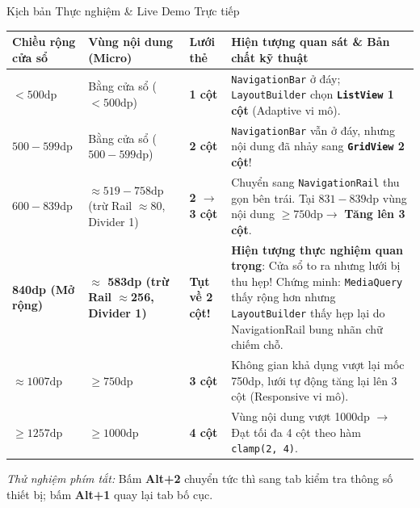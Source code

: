 \documentclass[aspectratio=169, 10pt]{beamer}
\begin{document}
\begin{frame}{Kịch bản Thực nghiệm \& Live Demo Trực tiếp}
  \vspace{-0.2cm}
  \centering
  \footnotesize
  \setlength{\tabcolsep}{4pt}
  \renewcommand{\arraystretch}{1.18}
  \begin{tabular}{|>{\centering\arraybackslash}p{2.3cm}|>{\centering\arraybackslash}p{2.4cm}|>{\centering\arraybackslash}p{1.4cm}|>{\raggedright\arraybackslash}p{6.4cm}|}
    \hline
    \rowcolor{TableHead}
    \centering\color{white}\textbf{Chiều rộng cửa sổ} & 
    \centering\color{white}\textbf{Vùng nội dung (Micro)} & 
    \centering\color{white}\textbf{Lưới thẻ} & 
    \centering\color{white}\textbf{Hiện tượng quan sát \& Bản chất kỹ thuật} \tabularnewline
    \hline
    \rowcolor{TableRowOdd}
    $< 500\text{dp}$ & 
    Bằng cửa sổ ($< 500\text{dp}$) & 
    \textbf{1 cột} & 
    \texttt{NavigationBar} ở đáy; \texttt{LayoutBuilder} chọn \textbf{\texttt{ListView} 1 cột} (Adaptive vi mô). \tabularnewline
    \hline
    \rowcolor{TableRowEven}
    $500 - 599\text{dp}$ & 
    Bằng cửa sổ ($500 - 599\text{dp}$) & 
    \textbf{2 cột} & 
    \texttt{NavigationBar} vẫn ở đáy, nhưng nội dung đã nhảy sang \textbf{\texttt{GridView} 2 cột}! \tabularnewline
    \hline
    \rowcolor{TableRowOdd}
    $600 - 839\text{dp}$ & 
    $\approx 519 - 758\text{dp}$ (trừ Rail $\approx 80$, Divider 1) & 
    \textbf{2 $\rightarrow$ 3 cột} & 
    Chuyển sang \texttt{NavigationRail} thu gọn bên trái. Tại $831 - 839\text{dp}$ vùng nội dung $\ge 750\text{dp} \rightarrow$ \textbf{Tăng lên 3 cột}. \tabularnewline
    \hline
    \rowcolor{TableRowEven}
    \textbf{840dp (Mở rộng)} & 
    \textbf{$\approx$ 583dp (trừ Rail $\approx$256, Divider 1)} & 
    \textbf{Tụt về 2 cột!} & 
    \textbf{Hiện tượng thực nghiệm quan trọng}: Cửa sổ to ra nhưng lưới bị thu hẹp! Chứng minh: \texttt{MediaQuery} thấy rộng hơn nhưng \texttt{LayoutBuilder} thấy hẹp lại do NavigationRail bung nhãn chữ chiếm chỗ. \tabularnewline
    \hline
    \rowcolor{TableRowOdd}
    $\approx 1007\text{dp}$ & 
    $\ge 750\text{dp}$ & 
    \textbf{3 cột} & 
    Không gian khả dụng vượt lại mốc 750dp, lưới tự động tăng lại lên 3 cột (Responsive vi mô). \tabularnewline
    \hline
    \rowcolor{TableRowEven}
    $\ge 1257\text{dp}$ & 
    $\ge 1000\text{dp}$ & 
    \textbf{4 cột} & 
    Vùng nội dung vượt 1000dp $\rightarrow$ Đạt tối đa 4 cột theo hàm \texttt{clamp(2, 4)}. \tabularnewline
    \hline
  \end{tabular}

  \vspace{0.14cm}
  \centering
  \scriptsize
  \textit{Thử nghiệm phím tắt:} Bấm \textbf{Alt+2} chuyển tức thì sang tab kiểm tra thông số thiết bị; bấm \textbf{Alt+1} quay lại tab bố cục.
\end{frame}
\end{document}
